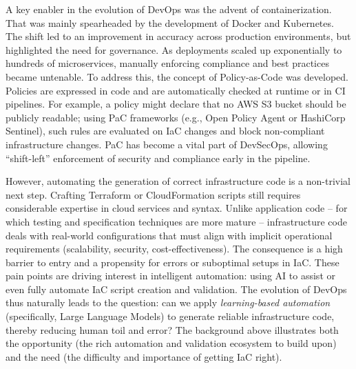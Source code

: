 \documentclass[acmsmall,screen,review,anonymous]{acmart}
\begin{document}
A key enabler in the evolution of DevOps was the advent of containerization. That was mainly spearheaded by the development of Docker \cite{merkel2014docker} and Kubernetes. The shift led to an improvement in accuracy across production environments, but highlighted the need for governance. As deployments scaled up exponentially to hundreds of microservices, manually enforcing compliance and best practices became untenable. To address this, the concept of Policy-as-Code \cite{chittala2024securing} was developed. Policies are expressed in code and are automatically checked at runtime or in CI pipelines. For example, a policy might declare that no AWS S3 bucket should be publicly readable; using PaC frameworks (e.g., Open Policy Agent or HashiCorp Sentinel), such rules are evaluated on IaC changes and block non-compliant infrastructure changes. PaC has become a vital part of DevSecOps, allowing “shift-left” enforcement of security and compliance early in the pipeline.

However, automating the generation of correct infrastructure code is a non-trivial next step. Crafting Terraform or CloudFormation scripts still requires considerable expertise in cloud services and syntax. Unlike application code – for which testing and specification techniques are more mature – infrastructure code deals with real-world configurations that must align with implicit operational requirements (scalability, security, cost-effectiveness). The consequence is a high barrier to entry and a propensity for errors or suboptimal setups in IaC. These pain points are driving interest in intelligent automation: using AI to assist or even fully automate IaC script creation and validation. The evolution of DevOps thus naturally leads to the question: can we apply \textit{learning-based automation} (specifically, Large Language Models) to generate reliable infrastructure code, thereby reducing human toil and error? The background above illustrates both the opportunity (the rich automation and validation ecosystem to build upon) and the need (the difficulty and importance of getting IaC right).
\end{document}
